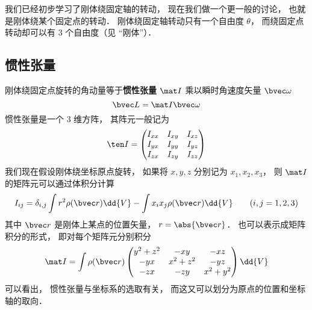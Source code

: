 

我们已经初步学习了刚体绕固定轴的转动， 现在我们做一个更一般的讨论， 也就是刚体绕某个固定点的转动． 刚体绕固定轴转动只有一个自由度 $\theta$， 而绕固定点转动却可以有 3 个自由度（见 “刚体”）．

\subsection{惯性张量}
刚体绕固定点旋转的角动量等于\textbf{惯性张量} $\mat I$ 乘以瞬时角速度矢量 $\bvec \omega$
\begin{equation}\label{ITensr_eq3}
\bvec L = \mat I \bvec \omega
\end{equation}
惯性张量是一个 3 维方阵， 其阵元一般记为
\begin{equation}
\ten I = \begin{pmatrix}
I_{xx}& I_{xy}& I_{xz} \\
I_{yx}& I_{yy}& I_{yz} \\
I_{zx}& I_{zy}& I_{zz}
\end{pmatrix}
\end{equation}
我们现在假设刚体绕坐标原点旋转， 如果将 $x, y, z$ 分别记为 $x_1, x_2, x_3$， 则 $\mat I$ 的矩阵元可以通过体积分计算
\begin{equation}\label{ITensr_eq1}
I_{ij} = \delta_{i, j} \int r^2 \rho(\bvec r)\dd{V} - \int x_i x_j \rho(\bvec r)\dd{V} \qquad (i, j = 1, 2, 3)
\end{equation}
其中 $\bvec r$ 是刚体上某点的位置矢量， $r = \abs{\bvec r}$． 也可以表示成矩阵积分的形式， 即对每个矩阵元分别积分
\begin{equation}\label{ITensr_eq2}
\mat I = \int \rho(\bvec r)
\begin{pmatrix}
y^2 + z^2 & -xy & -xz\\
-yx & x^2 + z^2 & -yz\\
-zx & -zy & x^2 + y^2
\end{pmatrix}
\dd{V}
\end{equation}
可以看出， 惯性张量与坐标系的选取有关， 而这又可以划分为原点的位置和坐标轴的取向．


